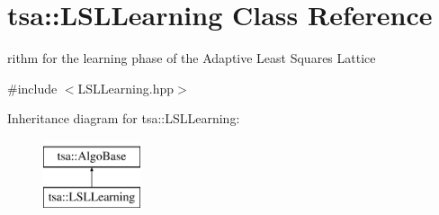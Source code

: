 \hypertarget{classtsa_1_1_l_s_l_learning}{}\section{tsa\+:\+:L\+S\+L\+Learning Class Reference}
\label{classtsa_1_1_l_s_l_learning}


rithm for the learning phase of the Adaptive Least Squares Lattice  




{\ttfamily \#include $<$L\+S\+L\+Learning.\+hpp$>$}

Inheritance diagram for tsa\+:\+:L\+S\+L\+Learning\+:\begin{figure}[H]
\begin{center}
\leavevmode
\includegraphics[height=2.000000cm]{classtsa_1_1_l_s_l_learning}
\end{center}
\end{figure}
